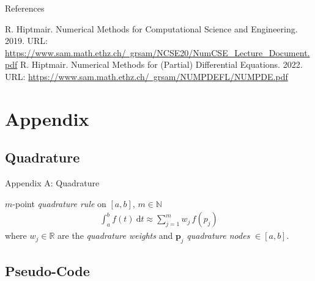 \documentclass[handout,xcolor=pdftex,table,10pt,yellow,mathserif]{beamer}
\begin{document}
\begin{frame}{References}
\begin{thebibliography}{99}
     R. Hiptmair. Numerical Methods for Computational Science and Engineering. 2019. URL: \href{https://www.sam.math.ethz.ch/~grsam/NCSE20/NumCSE_Lecture_Document.pdf}{https://www.sam.math.ethz.ch/~grsam/NCSE20/NumCSE\_Lecture\_Document.pdf}
     R. Hiptmair. Numerical Methods for (Partial) Differential Equations. 2022. URL: \href{https://www.sam.math.ethz.ch/~grsam/NUMPDEFL/NUMPDE.pdf}{https://www.sam.math.ethz.ch/~grsam/NUMPDEFL/NUMPDE.pdf}
\end{thebibliography}
\end{frame}


\section*{Appendix}

\subsection*{Quadrature}

\begin{frame}[noframenumbering]{Appendix A: Quadrature}
    
    $m$-point \emph{quadrature rule} on $[a,b]$, $m \in \mathbb{N}$
    \begin{align}
        \int_a^b f(t) \ \mathrm{d}t \approx \sum_{j=1}^m w_j \, f(p_j)
    \end{align}
    where $w_j \in \mathbb{R}$ are the \emph{quadrature weights} and $\boldsymbol{p}_j$ \emph{quadrature nodes} $\in [a, b]$. 
    
\end{frame}

\subsection*{Pseudo-Code}
\end{document}

